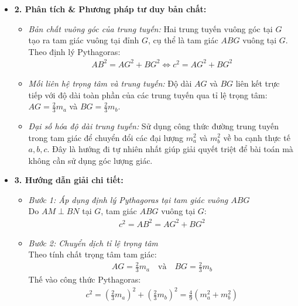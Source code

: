 \documentclass[12pt,a4paper]{article}
\begin{document}
\begin{itemize}
\begin{itemize}
        \item \textbf{2. Phân tích \& Phương pháp tư duy bản chất:}
        \begin{itemize}
            \item \textit{Bản chất vuông góc của trung tuyến:} Hai trung tuyến vuông góc tại $G$ tạo ra tam giác vuông tại đỉnh $G$, cụ thể là tam giác $ABG$ vuông tại $G$. Theo định lý Pythagoras:
            \begin{align*}
                AB^2 = AG^2 + BG^2 \Longleftrightarrow c^2 = AG^2 + BG^2
            \end{align*}
            \item \textit{Mối liên hệ trọng tâm và trung tuyến:} Độ dài $AG$ và $BG$ liên kết trực tiếp với độ dài toàn phần của các trung tuyến qua tỉ lệ trọng tâm: $AG = \frac{2}{3}m_a$ và $BG = \frac{2}{3}m_b$.
            \item \textit{Đại số hóa độ dài trung tuyến:} Sử dụng công thức đường trung tuyến trong tam giác để chuyển đổi các đại lượng $m_a^2$ và $m_b^2$ về ba cạnh thực tế $a, b, c$. Đây là hướng đi tự nhiên nhất giúp giải quyết triệt để bài toán mà không cần sử dụng góc lượng giác.
        \end{itemize}

        \item \textbf{3. Hướng dẫn giải chi tiết:}
        \begin{itemize}
            \item \textit{Bước 1: Áp dụng định lý Pythagoras tại tam giác vuông $ABG$}\\
            Do $AM \perp BN$ tại $G$, tam giác $ABG$ vuông tại $G$:
            \begin{align*}
                c^2 = AB^2 = AG^2 + BG^2
            \end{align*}

            \item \textit{Bước 2: Chuyển dịch tỉ lệ trọng tâm}\\
            Theo tính chất trọng tâm tam giác:
            \begin{align*}
                AG = \frac{2}{3}m_a \quad \text{và} \quad BG = \frac{2}{3}m_b
            \end{align*}
            Thế vào công thức Pythagoras:
            \begin{align*}
                c^2 = \left(\frac{2}{3}m_a\right)^2 + \left(\frac{2}{3}m_b\right)^2 = \frac{4}{9}\left(m_a^2 + m_b^2\right)
            \end{align*}


\end{itemize}
\end{itemize}
\end{itemize}
\end{document}

